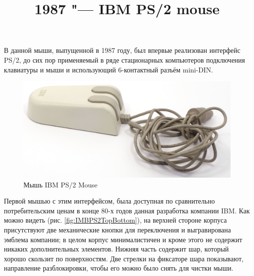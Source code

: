 \documentclass[11pt, a4paper]{article}
\begin{document}
\title{1987 "--- IBM PS/2 mouse}
\date{}
\maketitle

В данной мыши, выпущенной в 1987 году, был впервые реализован интерфейс PS/2, до сих пор применяемый в ряде стационарных компьютеров подключения клавиатуры и мыши и использующий 6-контактный разъём mini-DIN.

\begin{figure}[h]
    \centering
    \includegraphics[width=\textwidth]{1987_ibm_ps2_mouse/num0.JPG}
    \caption{Мышь IBM PS/2 Mouse}
    \label{fig:IMBPS2Pic}
\end{figure}

Первой мышью с этим интерфейсом, была доступная по сравнительно потребительским ценам в конце 80-х годов данная разработка компании IBM. Как можно видеть (рис. \ref{fig:IMBPS2TopBottom}), на верхней стороне корпуса присутствуют две механические кнопки для переключения и выгравирована эмблема компании; в целом корпус минималистичен и кроме этого не содержит никаких дополнительных элементов. Нижняя часть содержит шар, который хорошо скользит по поверхностям. Две стрелки на фиксаторе шара показывают, направление разблокировки, чтобы его можно было снять для чистки мыши.
\end{document}
